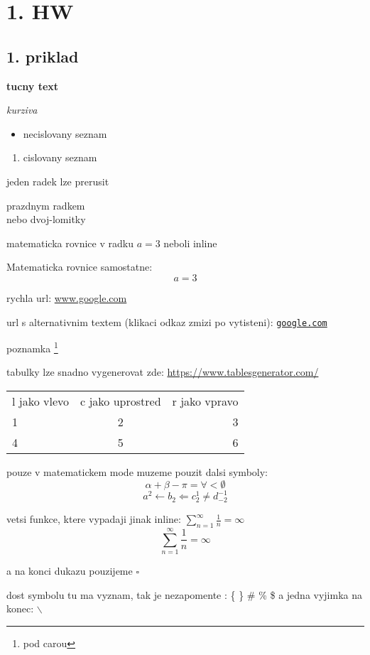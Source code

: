 \documentclass[a4paper]{article}
\begin{document}
\pagestyle{fancy}

\section*{1. HW}
\subsection*{1. priklad}

\textbf{tucny text}

\textit{kurziva}

\begin{itemize}
    \item necislovany seznam
\end{itemize}

\begin{enumerate}
    \item cislovany seznam
\end{enumerate}


jeden radek
lze prerusit

prazdnym radkem \\
nebo dvoj-lomitky

matematicka rovnice v radku $a=3$ neboli inline

Matematicka rovnice samostatne:
$$a=3$$

rychla url: \url{www.google.com}

url s alternativnim textem (klikaci odkaz zmizi po vytisteni): \href{https://google.com}{\nolinkurl{google.com}}

poznamka \footnote{pod carou}

tabulky lze snadno vygenerovat zde: \url{https://www.tablesgenerator.com/}

\begin{table}[h]
    \begin{tabular}{|l|c|r|} %
    l jako vlevo & c jako uprostred & r jako vpravo \\
    1 & 2 & 3 \\ \hline %
    4 & 5 & 6
    \end{tabular}
\end{table}

pouze v matematickem mode muzeme pouzit dalsi symboly:
$$\alpha+\beta-\pi=\forall<\emptyset$$
$$a^2 \leftarrow b_2 \Leftarrow c^1_2 \neq d^{-1}_{-2}$$

vetsi funkce, ktere vypadaji jinak inline: $\sum^{\infty}_{n=1} \frac{1}{n} = \infty$ 
$$\sum^{\infty}_{n=1} \frac{1}{n} = \infty$$

a na konci dukazu pouzijeme \hfill$\square$

dost symbolu tu ma vyznam, tak je nezapomente : \{ \} \# \% \$
a jedna vyjimka na konec: $\backslash$
\end{document}
